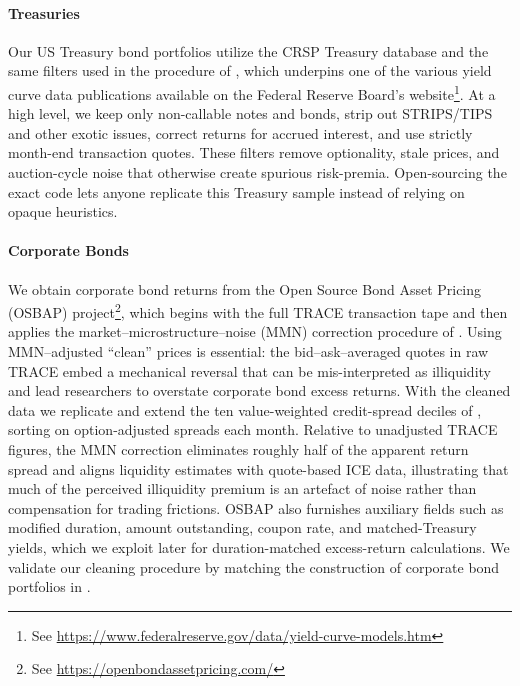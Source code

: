 \documentclass{article}
\begin{document}
\paragraph{Treasuries} Our US Treasury bond portfolios utilize the CRSP Treasury database and the same filters used in the procedure of  \cite{Gurkaynak2007}, which underpins one of the
various yield curve data publications available on the Federal Reserve Board's website\footnote{See \url{https://www.federalreserve.gov/data/yield-curve-models.htm}}. At a high level, we keep only non-callable notes and bonds, strip out STRIPS/TIPS and other exotic issues, correct returns for accrued interest, and use strictly month-end transaction quotes. These filters remove optionality, stale prices, and auction-cycle noise that otherwise create spurious risk-premia. Open-sourcing the exact code lets anyone replicate this Treasury sample instead of relying on opaque heuristics.


\paragraph{Corporate Bonds}
We obtain corporate bond returns from the Open Source Bond Asset Pricing (OSBAP) project\footnote{See \url{https://openbondassetpricing.com/}}, which begins with the full TRACE transaction tape and then applies the market--microstructure--noise (MMN) correction procedure of \citet{Dickerson2024}.  Using MMN--adjusted ``clean'' prices is essential: the bid--ask--averaged quotes in raw TRACE embed a mechanical reversal that can be mis-interpreted as illiquidity and lead researchers to overstate corporate bond excess returns.  With the cleaned data we replicate and extend the ten value-weighted credit-spread deciles of \citet{Nozawa2017}, sorting on option-adjusted spreads each month.  Relative to unadjusted TRACE figures, the MMN correction eliminates roughly half of the apparent return spread and aligns liquidity estimates with quote-based ICE data, illustrating that much of the perceived illiquidity premium is an artefact of noise rather than compensation for trading frictions.  OSBAP also furnishes auxiliary fields such as modified duration, amount outstanding, coupon rate, and matched-Treasury yields, which we exploit later for duration-matched excess-return calculations. We validate our cleaning procedure by matching the construction of corporate bond portfolios in \cite{He2017}.

\end{document}
